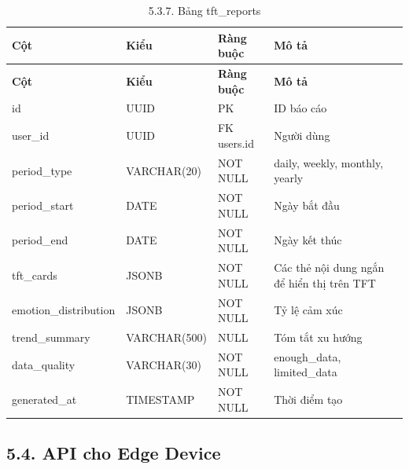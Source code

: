 \documentclass[12pt,a4paper]{article}
\begin{document}
\begin{center}
\scriptsize
\begin{longtable}{|P{0.18\textwidth}|P{0.25\textwidth}|P{0.25\textwidth}|P{0.22\textwidth}|}
\caption{5.3.7. Bảng tft\_reports}\\
\hline
\textbf{Cột} & \textbf{Kiểu} & \textbf{Ràng buộc} & \textbf{Mô tả} \\
\hline
\endfirsthead
\hline
\textbf{Cột} & \textbf{Kiểu} & \textbf{Ràng buộc} & \textbf{Mô tả} \\
\hline
\endhead
id & UUID & PK & ID báo cáo \\
\hline
user\_id & UUID & FK users.id & Người dùng \\
\hline
period\_type & VARCHAR(20) & NOT NULL & daily, weekly, monthly, yearly \\
\hline
period\_start & DATE & NOT NULL & Ngày bắt đầu \\
\hline
period\_end & DATE & NOT NULL & Ngày kết thúc \\
\hline
tft\_cards & JSONB & NOT NULL & Các thẻ nội dung ngắn để hiển thị trên TFT \\
\hline
emotion\_distribution & JSONB & NOT NULL & Tỷ lệ cảm xúc \\
\hline
trend\_summary & VARCHAR(500) & NULL & Tóm tắt xu hướng \\
\hline
data\_quality & VARCHAR(30) & NOT NULL & enough\_data, limited\_data \\
\hline
generated\_at & TIMESTAMP & NOT NULL & Thời điểm tạo \\
\hline
\end{longtable}
\normalsize
\end{center}

\subsection*{5.4. API cho Edge Device}
\end{document}
